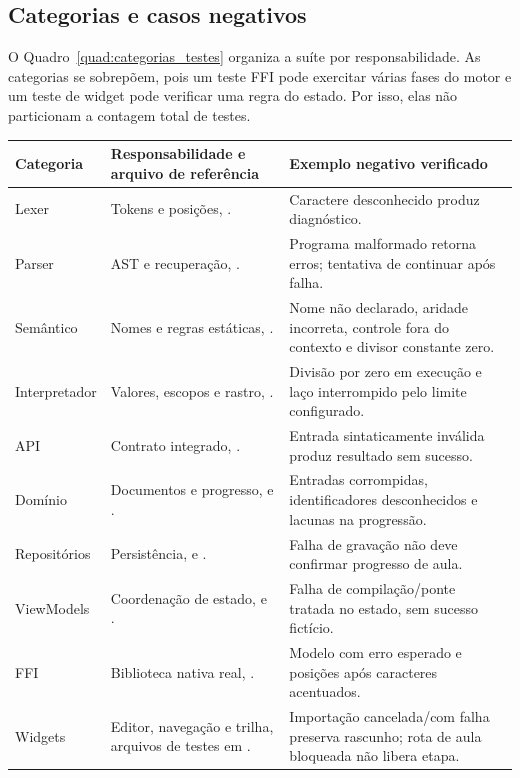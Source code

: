\subsection{Categorias e casos negativos}
\label{sec:categorias_testes}

O Quadro~\ref{quad:categorias_testes} organiza a suíte por responsabilidade.
As categorias se sobrepõem, pois um teste FFI pode exercitar várias fases do
motor e um teste de widget pode verificar uma regra do estado. Por isso, elas
não particionam a contagem total de testes.

\begin{quadro}[htb]
\centering
{}
\footnotesize
\begin{tabular}{|P{2.1cm}|P{5.2cm}|P{5.5cm}|}
\hline
Categoria & Responsabilidade e arquivo de referência & Exemplo negativo verificado \\
\hline\hline
Lexer & Tokens e posições, . & Caractere desconhecido produz diagnóstico. \\
\hline
Parser & AST e recuperação, . & Programa malformado retorna erros; tentativa de continuar após falha. \\
\hline
Semântico & Nomes e regras estáticas, . & Nome não declarado, aridade incorreta, controle fora do contexto e divisor constante zero. \\
\hline
Interpretador & Valores, escopos e rastro, . & Divisão por zero em execução e laço interrompido pelo limite configurado. \\
\hline
API & Contrato integrado, . & Entrada sintaticamente inválida produz resultado sem sucesso. \\
\hline
Domínio & Documentos e progresso,  e . & Entradas corrompidas, identificadores desconhecidos e lacunas na progressão. \\
\hline
Repositórios & Persistência,  e . & Falha de gravação não deve confirmar progresso de aula. \\
\hline
ViewModels & Coordenação de estado,  e . & Falha de compilação/ponte tratada no estado, sem sucesso fictício. \\
\hline
FFI & Biblioteca nativa real, . & Modelo com erro esperado e posições após caracteres acentuados. \\
\hline
Widgets & Editor, navegação e trilha, arquivos de testes em . & Importação cancelada/com falha preserva rascunho; rota de aula bloqueada não libera etapa. \\
\hline
\end{tabular}
\vspace{0.2cm}
\end{quadro}
\FloatBarrier
